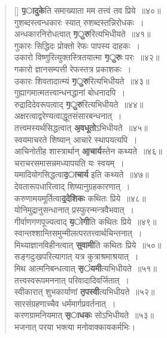 \documentclass[twoside,12pt,notitlepage]{book}
\begin{document}
\begin{verse}[\versewidth]
\textbf{\b पादुके}ति समाख्याता मम तत्त्वं तव प्रिये~॥४०॥\\
गुशब्दस्त्वन्धकारः स्यात् रुशब्दस्तन्निरोधकः~।\\[-6pt]
अन्धकारनिरोधत्वात् \textbf{\b गुरु}रित्यभिधीयते~॥४१॥\\[-6pt]
गुकारः सिद्धिदः प्रोक्तो रेफः पापस्य दाहकः~।\\[-6pt]
उकारो विष्णुरित्युक्तस्त्रितयात्मा \textbf{\b गुरुः} परः~॥४२॥\\
गकारो ज्ञानसम्पत्ती रेफस्तत्र प्रकाशकः~।\\[-6pt]
उकारः शिवतादात्म्यं \textbf{\b गुरु}रित्यभिधीयते~॥४३॥\\
गुह्यागमात्मतत्त्वान्धनद्धानां बोधनादपि~।\\[-6pt]
रुद्रादिदेवरूपत्वाद् \textbf{\b गुरु}रित्यभिधीयते~॥४४॥\\
अक्षरत्वाद्वरेण्यत्वाद्धूतसंसारबन्धनात्~।\\[-6pt]
तत्त्वमस्यर्थसिद्धत्वात् \textbf{\b अवधूतो}ऽभिधीयते~॥४५॥\\
स्वयमाचरते शिष्यान् आचारे स्थापयत्यपि~।\\[-6pt]
आचिनोतीह शास्त्रार्थान् \textbf{\b आचार्य}स्तेन कथ्यते~॥४६॥ \\[-6pt]
चराचरसमासन्नमध्यापयति यः स्वयम्~।\\[-6pt]
यमादियोगसिद्धत्वा\textbf{\b दाचार्य} इति कथ्यते~॥४७॥\\
देवतारूपधारित्वाद् शिष्यानुग्रहकारणात्~।\\[-6pt]
करुणामयमूर्तित्वा\textbf{\b द्देशिकः} कथितः प्रिये~॥४८॥\\
योनिमुद्रानुसन्धानात् प्रस्फुरन्मन्त्रवैभवात्~।\\[-6pt]
गीर्वाणगणपूज्यत्वाद् \textbf{\b योगी}ति कथितः प्रिये~॥४९॥ \\
स्वान्तश्शान्तिसमुन्मीलत्परतत्त्वार्थचिन्तनात्~।\\[-6pt]
मिथ्याज्ञानविहीनत्वात् \textbf{\b स्वामी}ति कथितः प्रिये~॥५०॥\\
सङ्गदुःखपरित्यागात् यत्र कुत्राश्रमाश्रयात्~।\\[-6pt]
मिथ आत्मनिबन्धत्वात् \textbf{\b संयमी}त्यभिधीयते~॥५१॥\\
तत्त्वस्वरूपमननात् परिवादादिवर्जितात्~।\\[-6pt]
स्वीकारात् शुभकार्याणां \textbf{\b तपस्वी}त्यभिधीयते~॥५२॥\\
सारसंग्रहणाच्चैव धर्ममार्गप्रवर्तनात्~।\\[-6pt]
करणग्रामनियमात् \textbf{\b साधकः} सोऽभिधीयते~॥५३॥\\
भजनात् परया भक्त्या मनोवाक्कायकर्मभिः।\\[-6pt]

\end{verse}
\end{document}
